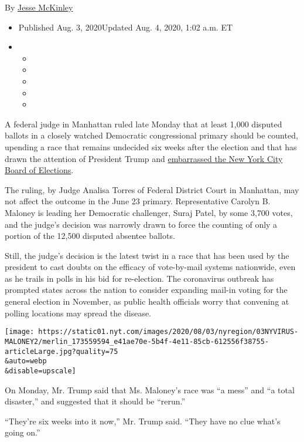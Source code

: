 By \href{https://www.nytimes.com/by/jesse-mckinley}{Jesse McKinley}

\begin{itemize}
\item
  Published Aug. 3, 2020Updated Aug. 4, 2020, 1:02 a.m. ET
\item
  \begin{itemize}
  \item
  \item
  \item
  \item
  \item
  \end{itemize}
\end{itemize}

A federal judge in Manhattan ruled late Monday that at least 1,000
disputed ballots in a closely watched Democratic congressional primary
should be counted, upending a race that remains undecided six weeks
after the election and that has drawn the attention of President Trump
and
\href{https://www.nytimes.com/2020/08/03/nyregion/nyc-mail-ballots-voting.html}{embarrassed
the New York City Board of Elections}.

The ruling, by Judge Analisa Torres of Federal District Court in
Manhattan, may not affect the outcome in the June 23 primary.
Representative Carolyn B. Maloney is leading her Democratic challenger,
Suraj Patel, by some 3,700 votes, and the judge's decision was narrowly
drawn to force the counting of only a portion of the 12,500 disputed
absentee ballots.

Still, the judge's decision is the latest twist in a race that has been
used by the president to cast doubts on the efficacy of vote-by-mail
systems nationwide, even as he trails in polls in his bid for
re-election. The coronavirus outbreak has prompted states across the
nation to consider expanding mail-in voting for the general election in
November, as public health officials worry that convening at polling
locations may spread the disease.

\texttt{[image: https://static01.nyt.com/images/2020/08/03/nyregion/03NYVIRUS-MALONEY2/merlin\_173559594\_e41ae70e-5b4f-4e11-85cb-612556f38755-articleLarge.jpg?quality=75\\\&auto=webp\\\&disable=upscale]}

On Monday, Mr. Trump said that Ms. Maloney's race was ``a mess'' and ``a
total disaster,'' and suggested that it should be ``rerun.''

``They're six weeks into it now,'' Mr. Trump said. ``They have no clue
what's going on.''

